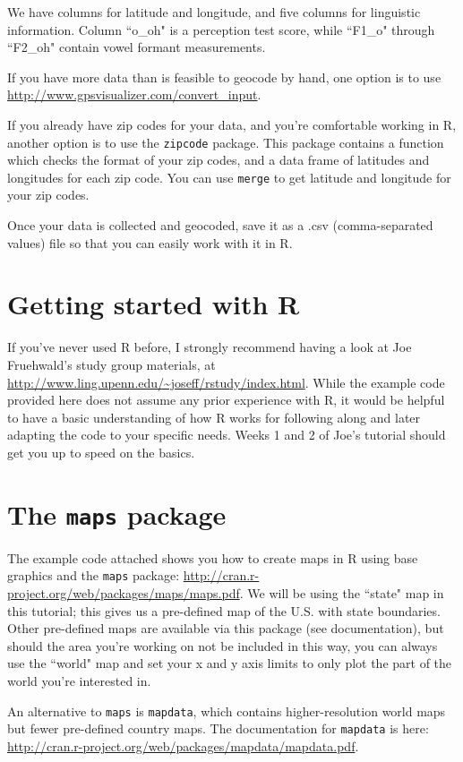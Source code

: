 \documentclass[12pt]{article}
\begin{document}
\noindent We have columns for latitude and longitude, and five columns for linguistic information. Column ``o\_oh" is a perception test score, while ``F1\_o" through ``F2\_oh" contain vowel formant measurements.

If you have more data than is feasible to geocode by hand, one option is to use \url{http://www.gpsvisualizer.com/convert_input}.  

If you already have zip codes for your data, and you're comfortable working in R, another option is to use the \texttt{zipcode} package. This package contains a function which checks the format of your zip codes, and a data frame of latitudes and longitudes for each zip code. You can use \texttt{merge} to get latitude and longitude for your zip codes.

Once your data is collected and geocoded, save it as a .csv (comma-separated values) file so that you can easily work with it in R.

\section{Getting started with R}
If you've never used R before, I strongly recommend having a look at Joe Fruehwald's study group materials, at \url{http://www.ling.upenn.edu/~joseff/rstudy/index.html}. While the example code provided here does not assume any prior experience with R, it would be helpful to have a basic understanding of how R works for following along and later adapting the code to your specific needs. Weeks 1 and 2 of Joe's tutorial should get you up to speed on the basics.

\section{The \texttt{maps} package}
The example code attached shows you how to create maps in R using base graphics and the \texttt{maps} package: \url{http://cran.r-project.org/web/packages/maps/maps.pdf}. We will be using the ``state" map in this tutorial; this gives us a pre-defined map of the U.S. with state boundaries. Other pre-defined maps are available via this package (see documentation), but should the area you're working on not be included in this way, you can always use the ``world" map and set your x and y axis limits to only plot the part of the world you're interested in.

An alternative to \texttt{maps} is \texttt{mapdata}, which contains higher-resolution world maps but fewer pre-defined country maps. The documentation for \texttt{mapdata} is here: \url{http://cran.r-project.org/web/packages/mapdata/mapdata.pdf}.
\end{document}
